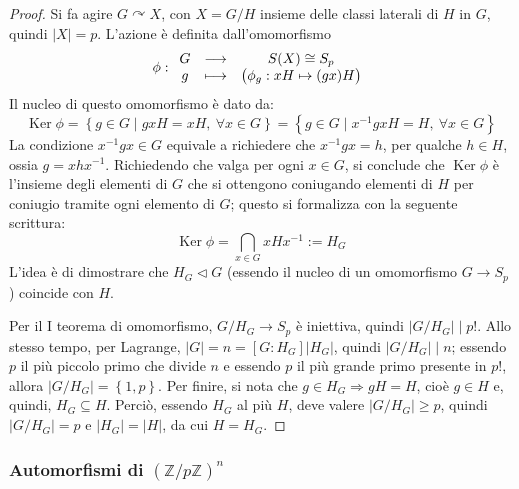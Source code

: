 \documentclass[12pt]{scrartcl}
\theoremstyle{style}
\numberwithin{equation}{subsection}
\begin{document}
	\begin{proof}
		Si fa agire $G \curvearrowright X$, con $X = G / H$ insieme delle classi laterali di $H$ in $G$, quindi $\lvert X \rvert = p$. 
		L'azione \`e definita dall'omomorfismo
		\[
\phi :
		\begin{array}
			{c c c}
			G &\longrightarrow & S(X) \cong S_p\\
			 g &\longmapsto & \big(\phi _g:xH \mapsto (gx) H\big)
		\end{array}
		\] 
		Il nucleo di questo omomorfismo \`e dato da: 
		\[
			\operatorname{Ker} \phi = \left\{ g \in G  \mid  gxH = xH ,\ \forall x \in G \right\} = \left\{ g \in G  \mid x^{-1}gx H = H, \ \forall x \in G \right\} 
		\] 
		La condizione $x^{-1}gx \in G$ equivale a richiedere che $x^{-1}g x = h$, per qualche $h\in H$, ossia $g = xhx^{-1}$.
		Richiedendo che valga per ogni $x \in G$, si conclude che $\operatorname{Ker} \phi $ \`e l'insieme degli elementi di $G$ che si ottengono coniugando elementi di $H$ per coniugio tramite ogni elemento di $G$; questo si formalizza con la seguente scrittura:
		\[
		\operatorname{Ker} \phi = \bigcap_{x \in G} xHx^{-1}:=H_G
		\] 
L'idea \`e di dimostrare che $H_G \lhd G$ (essendo il nucleo di un omomorfismo $G \to S_p$) coincide con $H$.

Per il I teorema di omomorfismo, $G / H_G \longrightarrow S_p$ \`e iniettiva, quindi $\lvert G / H_G \rvert  \mid p !$.
Allo stesso tempo, per Lagrange, $\lvert G \rvert = n = [G:H_G]\lvert H_G \rvert $, quindi $\lvert G / H_G \rvert  \mid n$; essendo $p$ il pi\`u piccolo primo che divide $n$ e essendo $p$ il pi\`u grande primo presente in $p!$, allora $\lvert G / H_G \rvert = \left\{ 1,p \right\} $.
Per finire, si nota che $g \in H_G \Rightarrow gH = H$, cio\`e $g \in H$ e, quindi, $H_G \subseteq H$. 
Perci\`o, essendo $H_G$ al pi\`u $H$, deve valere $\lvert G / H_G \rvert \ge p$, quindi $\lvert G/H_G \rvert = p$ e $\lvert H_G \rvert =\lvert H \rvert $, da cui $H= H_G$.
	\end{proof}
\subsubsection{Automorfismi di $(\mathbb{Z}/p\mathbb{Z})^n$}
\end{document}
